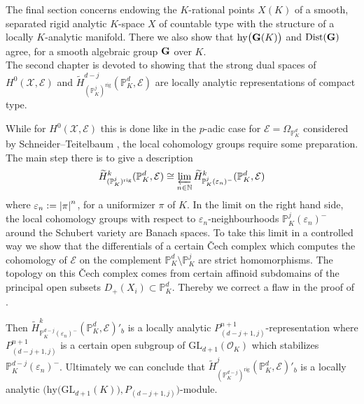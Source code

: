 \documentclass[a4paper, reqno, 10pt]{amsart}
\theoremstyle{definition}
\numberwithin{equation}{section}
\newcommand{\abs}[1]{{\lvert{#1}\rvert}}
\newcommand{\defeq}{\vcentcolon=}
\newcommand{\GL}{{\mathrm{GL}}}
\newcommand{\hy}{{\mathrm{hy}}}
\newcommand{\rig}{{\mathrm{rig}}}
\newcommand{\BN}{{\mathbb {N}}}
\newcommand{\BP}{{\mathbb {P}}}
\newcommand{\CE}{{\mathcal {E}}}
\newcommand{\CO}{{\mathcal {O}}}
\newcommand{\CX}{{\mathcal {X}}}
\newcommand{\bG}{{\mathrm{\bf G}}}
\newcommand{\unif}{{\pi}}
\begin{document}
The final section concerns endowing the $K$-rational points $X(K)$ of a smooth, separated rigid analytic $K$-space $X$ of countable type with the structure of a locally $K$-analytic manifold.
There we also show that $\hy\big(\bG(K)\big)$ and ${\rm Dist}(\bG)$ agree, for a smooth algebraic group $\bG$ over $K$.
\\



The second chapter is devoted to showing that the strong dual spaces of $H^0(\CX,\CE)$ and $\widetilde{H}^{d-j}_{(\BP_K^{j})^\rig}(\BP_K^d, \CE)$ are locally analytic representations of compact type.

While for $H^0(\CX,\CE)$ this is done like in the $p$-adic case for $\CE = \Omega_{\BP_K^d}$ considered by Schneider--Teitelbaum \cite{SchneiderTeitelbaum02pAdicBoundVal}, the local cohomology groups require some preparation.
The main step there is to give a description 
\begin{equation*}
	\widetilde{H}^k_{(\BP_K^{j})^\rig}(\BP_K^d, \CE) \cong \varprojlim_{n\in \BN} \widetilde{H}^k_{\BP_K^{j}(\varepsilon_n)^-}(\BP_K^d, \CE)
\end{equation*}
where $\varepsilon_n \defeq \abs{\unif}^n $, for a uniformizer $\unif$ of $K$.
In the limit on the right hand side, the local cohomology groups with respect to $\varepsilon_n$-neigh\-bour\-hoods $\BP_K^{j}(\varepsilon_n)^-$ around the Schubert variety are Banach spaces.
To take this limit in a controlled way we show that the differentials of a certain \v{C}ech complex which computes the cohomology of $\CE$ on the complement $\BP_K^d \setminus \BP_K^j$ are strict homomorphisms.
The topology on this \v{C}ech complex comes from certain affinoid subdomains of the principal open subsets $D_+(X_i) \subset \BP_K^d$.
Thereby we correct a flaw in the proof of \cite[Lemma 1.3.1]{Orlik08EquivVBDrinfeldUpHalfSp}.



Then $\widetilde{H}^k_{\BP_K^{d-j}(\varepsilon_n)^-}(\BP_K^d, \CE)'_b$ is a locally analytic $P^{n+1}_{(d-j+1,j)}$-representation where $P^{n+1}_{(d-j+1,j)}$ is a certain open subgroup of $\GL_{d+1}(\CO_K)$ which stabilizes $\BP_K^{d-j}(\varepsilon_n)^-$.
Ultimately we can conclude that $\widetilde{H}^{j}_{(\BP_K^{d-j})^\rig}(\BP_K^d, \CE)'_b$ is a locally analytic $\big(\hy\big( \GL_{d+1}(K) \big), P_{(d-j+1,j)} \big)$-module.
\\
\end{document}
